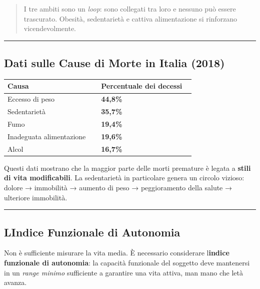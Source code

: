 \documentclass[a4paper,11pt]{article}
\begin{document}
\begin{quote}
      I tre ambiti sono un \emph{loop}: sono collegati tra loro e nessuno può
      essere trascurato. Obesità, sedentarietà e cattiva alimentazione si
      rinforzano vicendevolmente.
\end{quote}

\begin{center}\rule{0.5\linewidth}{0.5pt}\end{center}

\subsection{Dati sulle Cause di Morte in Italia
      (2018)}\label{dati-sulle-cause-di-morte-in-italia-2018}

\begin{longtable}[]{@{}p{0.47\linewidth}p{0.47\linewidth}@{}}
      \toprule\noalign{}
      Causa                    & Percentuale dei decessi \\
      \midrule\noalign{}
      \endhead
      \bottomrule\noalign{}
      \endlastfoot
      Eccesso di peso          & \textbf{44,8\%}         \\
      Sedentarietà             & \textbf{35,7\%}         \\
      Fumo                     & \textbf{19,4\%}         \\
      Inadeguata alimentazione & \textbf{19,6\%}         \\
      Alcol                    & \textbf{16,7\%}         \\
\end{longtable}

Questi dati mostrano che la maggior parte delle morti premature è legata
a \textbf{stili di vita modificabili}. La sedentarietà in particolare
genera un circolo vizioso: dolore → immobilità → aumento di peso →
peggioramento della salute → ulteriore immobilità.

\begin{center}\rule{0.5\linewidth}{0.5pt}\end{center}

\subsection{L\textquotesingle Indice Funzionale di
      Autonomia}\label{lindice-funzionale-di-autonomia}

Non è sufficiente misurare la vita media. È necessario considerare
l\textquotesingle{}\textbf{indice funzionale di autonomia}: la capacità
funzionale del soggetto deve mantenersi in un \emph{range minimo}
sufficiente a garantire una vita attiva, man mano che
l\textquotesingle età avanza.
\end{document}
